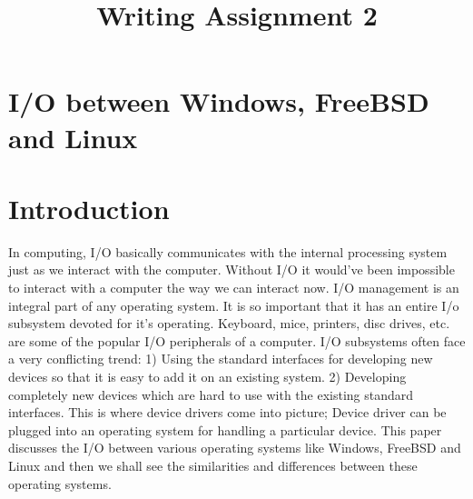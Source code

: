 \documentclass[letterpaper,10pt,titlepage]{IEEEtran}
\author{\name}
\title{Writing Assignment 2}
\begin{document}
\maketitle
\hrulefill

\section{I/O between Windows, FreeBSD and Linux}
\section*{Introduction}
In computing, I/O basically communicates with the internal processing system just as we interact with the computer. Without I/O it would've been impossible to interact with a computer the way we can interact now. I/O management is an integral part of any operating system. It is so important that it has an entire I/o subsystem devoted for it's operating. Keyboard, mice, printers, disc drives, etc. are some of the popular I/O peripherals of a computer. I/O subsystems often face a very conflicting trend: 1) Using the standard interfaces for developing new devices so that it is easy to add it on an existing system. 2) Developing completely new devices which are hard to use with the existing standard interfaces. This is where device drivers come into picture; Device driver can be plugged into an operating system for handling a particular device. This paper discusses the I/O between various operating systems like Windows, FreeBSD and Linux and then we shall see the similarities and differences between these operating systems.
\end{document}
